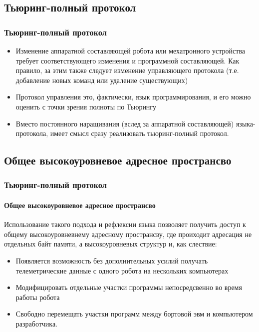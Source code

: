 \documentclass{beamer}
\begin{document}
\subsection{Тьюринг-полный протокол}
\begin{frame}
\frametitle{Тьюринг-полный протокол}
\begin{itemize}
  \item<1> Изменение аппаратной составляющей робота или мехатронного устройства
  требует соответствующего изменения и программной составляющей. Как правило, за
  этим также следует изменение управляющего протокола (т.е. добавление новых
  команд или удаление существующих)
\item<1> Протокол управления это, фактически, язык программирования, и его можно
оценить с точки зрения полноты по Тьюрингу
\item<1> Вместо постоянного наращивания (вслед за аппаратной составляющей)
языка-протокола, имеет смысл сразу реализовать тьюринг-полный протокол.
\end{itemize}
\end{frame}

\subsection{Общее высокоуровневое адресное пространсво}
\begin{frame}
\frametitle{Тьюринг-полный протокол}
\framesubtitle{Общее высокоуровневое адресное пространсво}
Использование такого подхода и рефлексии языка позволяет получить доступ к общему
высокоуровневнему адресному пространсву, где проиходит адресация не отдельных
байт памяти, а высокоуровневых структур и, как слествие:
\begin{itemize}
	\item<1>Появляется возможность без дополнительных усилий получать
	телеметрические данные с одного робота на нескольких компьютерах 
	\item<1>Модифицировать отдельные участки программы непосредсвенно во время
	работы робота
	\item<1>Свободно перемещать участки программ между бортовой эвм и компьютером
	разработчика.
\end{itemize}
\end{frame}
\end{document}
